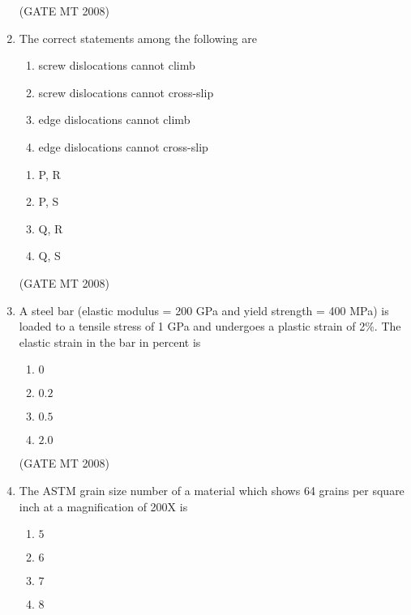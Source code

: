 \documentclass[11pt, letterpaper]{article}
\theoremstyle{remark}
\begin{document}
\begin{enumerate}
\hfill(GATE MT 2008)

\item The correct statements among the following are
\begin{enumerate}
    \item screw dislocations cannot climb
    \item screw dislocations cannot cross-slip
    \item edge dislocations cannot climb
    \item edge dislocations cannot cross-slip
\end{enumerate}

\begin{multicols}{4}
\begin{enumerate}
\item P, R
\item P, S
\item Q, R
\item Q, S
\end{enumerate}
\end{multicols}

\hfill(GATE MT 2008)

\item A steel bar (elastic modulus = 200 GPa and yield strength = 400 MPa) is loaded to a tensile stress of 1 GPa and undergoes a plastic strain of 2\%. The elastic strain in the bar in percent is

\begin{multicols}{4}
\begin{enumerate}
\item $0$
\item $0.2$
\item $0.5$
\item $2.0$
\end{enumerate}
\end{multicols}

\hfill(GATE MT 2008)



\item The ASTM grain size number of a material which shows 64 grains per square inch at a magnification of 200X is

\begin{multicols}{4}
\begin{enumerate}
\item $5$
\item $6$
\item $7$
\item $8$
\end{enumerate}
\end{multicols}


\end{enumerate}
\end{document}
